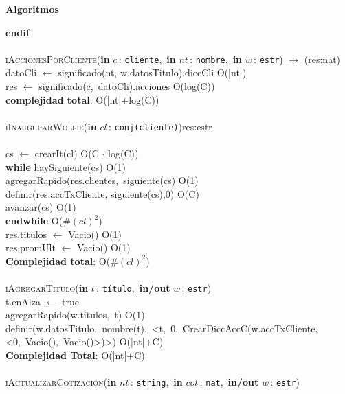 \documentclass[10pt, a4paper]{article}
\let\NombreFuncion=\textsc
\let\TipoVariable=\texttt
\let\ModificadorArgumento=\textbf
\newcommand{\tab}{\hspace*{7mm}}
\newcommand{\In}[2]{\ModificadorArgumento{in} \ensuremath{#1}\,: \TipoVariable{#2}\xspace}
\newcommand{\Inout}[2]{\ModificadorArgumento{in/out} \ensuremath{#1}\,: \TipoVariable{#2}\xspace}
\newenvironment{Algoritmos}{%
  \vspace*{2ex}%
  \noindent\textbf{\Large Algoritmos}%
  \vspace*{2ex}%
}{}
\begin{document}
\begin{Algoritmos}
\tab \textbf{endif}
\\ \\
\NombreFuncion{iAccionesPorCliente}(\In{c}{cliente},\ \In {nt}{nombre},\ \In {w}{estr}) $\rightarrow$ (res:nat)
\\
\tab datoCli $\leftarrow$ significado(nt, w.datosTitulo).diccCli \hfill O(|nt|)
\\
\tab res $\leftarrow$ significado(c,\ datoCli).acciones \hfill O(log(C))
\\
\textbf{complejidad total}: O(|nt|+log(C))
\\ \\
\NombreFuncion{iInaugurarWolfie}(\In{cl}{conj(cliente)}){res:estr}\\
\\
\tab cs $\leftarrow$ crearIt(cl) \hfill O(C $\cdot$ log(C))
\\
\tab \textbf{while} haySiguiente(cs) \hfill O(1)
\\
\tab \tab agregarRapido(res.clientes,\ siguiente(cs) \hfill O(1)
\\
\tab \tab definir(res.accTxCliente, siguiente(cs),0) \hfill O(C)
\\
\tab \tab avanzar(cs) \hfill O(1)
\\
\tab \textbf{endwhile} \hfill O($\#(cl)^{2}$)
\\
\tab res.titulos $\leftarrow$ Vacio() \hfill O(1)
\\
\tab res.promUlt $\leftarrow$ Vacio() \hfill O(1)
\\
\textbf{Complejidad total}: O($\#(cl)^{2}$)
\\ \\
\NombreFuncion{iAgregarTitulo}(\In{t}{t\'{i}tulo},\ \Inout{w}{estr})
\\
\tab t.enAlza $\leftarrow$ true
\\
\tab agregarRapido(w.titulos,\ t) \hfill O(1)
\\
\tab definir(w.datosTitulo,\ nombre(t),\ <t,\ 0,\ CrearDiccAccC(w.accTxCliente, <0,\ Vacio(),\ Vacio()>)>) \hfill O(|nt|+C) 
\\
\textbf{Complejidad Total}: O(|nt|+C)
\\ \\
\NombreFuncion{iActualizarCotizaci\'{o}n}(\In{nt}{string},\ \In{cot}{nat},\ \Inout{w}{estr})\\


\end{Algoritmos}
\end{document}

